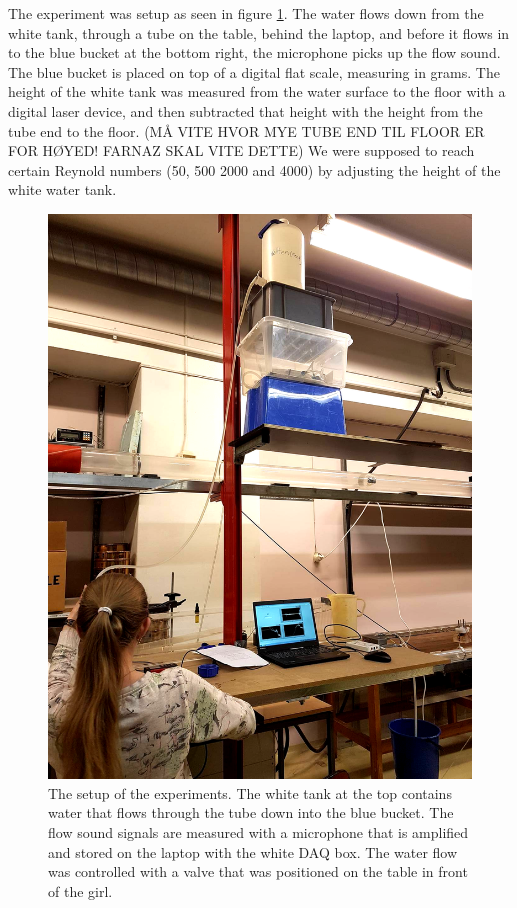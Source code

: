 \documentclass[english,a4paper,12pt]{article}
\begin{document}
The experiment was setup as seen in figure \ref{fig:1}. The water flows down from the white tank, through a tube on the table, behind the laptop, and before it flows in to the blue bucket at the bottom right, the microphone picks up the flow sound. The blue bucket is placed on top of a digital flat scale, measuring in grams. The height of the white tank was measured from the water surface to the floor with a digital laser device, and then subtracted that height with the height from the tube end to the floor. (MÅ VITE HVOR MYE TUBE END TIL FLOOR ER FOR HØYED! FARNAZ SKAL VITE DETTE) We were supposed to reach certain Reynold numbers (50, 500 2000 and 4000) by adjusting the height of the white water tank. \bigskip

\begin{figure}[H]
    \centering
    \includegraphics[width=150mm]{ExperimentSetup.png}
    \caption{The setup of the experiments. The white tank at the top contains water that flows through the tube down into the blue bucket. The flow sound signals are measured with a microphone that is amplified and stored on the laptop with the white DAQ box. The water flow was controlled with a valve that was positioned on the table in front of the girl.}
    \label{fig:1}
\end{figure}
\end{document}
